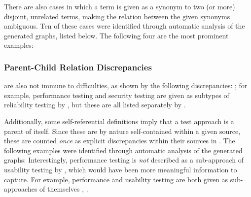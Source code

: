 \label{multiSyns}
There are also cases in which a term is given as a synonym to two (or more)
disjoint, unrelated terms, making the relation between the given synonyms
ambiguous. Ten of these cases were identified through automatic analysis of
the generated graphs\ifnotpaper, listed below\else. The following four are the
most prominent examples\fi:

\ifnotpaper\else\fi

\begin{enumerate}
    
\end{enumerate}

\subsubsection{Parent-Child Relation Discrepancies}
\label{pars}

 are also not immune to difficulties\ifnotpaper, as shown
by the following discrepancies:
 \else; for example, performance \fi testing and
security testing are given as subtypes of reliability testing by
\citep{ISO_IEC2023a}, but these are all listed separately by
\citep[p.~53]{Firesmith2015}.

\label{selfPars}
Additionally, some self-referential definitions imply that a test
approach is a parent of itself. Since these are by nature self-contained within
a given source, these are counted \emph{once} as explicit discrepancies within
their sources in . \ifnotpaper The following
    examples were identified through automatic analysis of the generated graphs:
     Interestingly, performance testing is \emph{not}
    described as a sub-approach of usability testing by \citep{Gerrard2000a,
        Gerrard2000b}, which would have been more meaningful information to
    capture. \else For example, performance and usability testing are both
    given as sub-approaches of themselves \cite[Tab.~2]{Gerrard2000a},
    \cite[Tab.~1]{Gerrard2000b}.\fi

